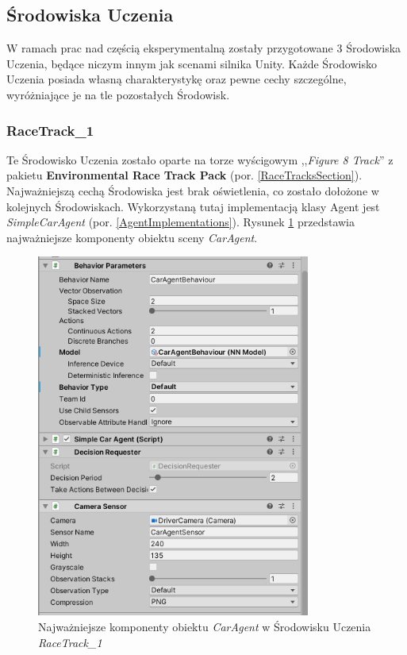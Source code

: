 \subsection{Środowiska Uczenia}
\label{LearningEnvsSubsection}
W ramach prac nad częścią eksperymentalną zostały przygotowane 3 Środowiska Uczenia, będące niczym innym jak scenami silnika Unity. Każde Środowisko Uczenia posiada własną charakterystykę oraz pewne cechy szczególne, wyróżniające je na tle pozostałych Środowisk.

\subsubsection{RaceTrack\_1}
Te Środowisko Uczenia zostało oparte na torze wyścigowym ,,\textit{Figure 8 Track}'' z pakietu \textbf{Environmental Race Track Pack} (por. \ref{RaceTracksSection}). Najważniejszą cechą Środowiska jest brak oświetlenia, co zostało dołożone w kolejnych Środowiskach. Wykorzystaną tutaj implementacją klasy Agent jest \textit{SimpleCarAgent} (por. \ref{AgentImplementations}). Rysunek \ref{RaceTrack1AgentComps} przedstawia najważniejsze komponenty obiektu sceny \textit{CarAgent}. \\
\begin{figure}[h]
\begin{center}
\includegraphics[width=9cm]{resources/figures/race_track_1_agent_components.png}
\caption{Najważniejsze komponenty obiektu \textit{CarAgent} w Środowisku Uczenia \textit{RaceTrack\_1}}
\label{RaceTrack1AgentComps}
\end{center}
\end{figure}
